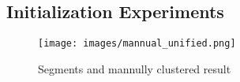\subsection{Initialization Experiments}
\begin{figure*}
	\centering
	\texttt{[image: images/mannual\_unified.png]}
	\caption{Segments and mannully clustered result}
	\label{fig:input_for_init}
\end{figure*}

